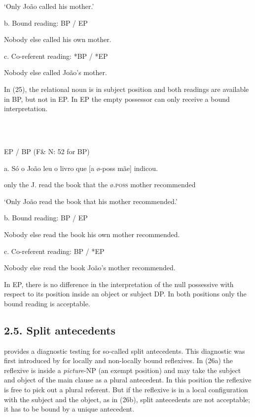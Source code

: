 \documentclass[output=paper]{langsci/langscibook}
\begin{document}
‘Only João called his mother.’

b.  Bound reading: BP / EP

Nobody else called his own mother.

c.  Co-referent reading: *BP / *EP

Nobody else called João’s mother.

In (25), the relational noun is in subject position and both readings are available in BP, but not in EP. In EP the empty possessor can only receive a bound interpretation.

\ea%
    \label{ex:key:25}
    \gll\\
        \\
    \glt
    \z

          EP / BP (F\& N: 52 for BP)

  a.  Só o João leu o livro que [a ø-poss mãe] indicou.

only the J. read the book that the ø\textsc{.poss} mother recommended

‘Only João read the book that his mother recommended.’

b.  Bound reading: BP / EP

Nobody else read the book his own mother recommended.

c.  Co-referent reading: BP / *EP

Nobody else read the book João’s mother recommended.

In EP, there is no difference in the interpretation of the null possessive with respect to its position inside an object or subject DP. In both positions only the bound reading is acceptable.

\subsection{ 2.5. Split antecedents}

\citet{Rodrigues2010} provides a diagnostic testing for so-called split antecedents. This diagnostic was first introduced by \citet{Lebeaux1985} for locally and non-locally bound reflexives. In (26a) the reflexive is inside a \textit{picture}{}-NP (an exempt position) and may take the subject and object of the main clause as a plural antecedent. In this position the reflexive is free to pick out a plural referent. But if the reflexive is in a local configuration with the subject and the object, as in (26b), split antecedents are not acceptable; it has to be bound by a unique antecedent.

\ea%
    \label{ex:key:26}
    \gll\\
        \\
    \glt
    \z
\end{document}
